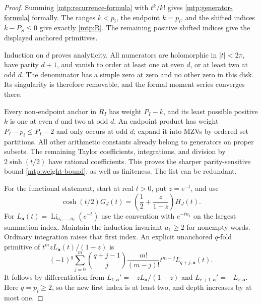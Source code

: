\documentclass[11pt,letterpaper]{article}
\numberwithin{equation}{section}
\theoremstyle{definition}
\theoremstyle{remark}
\begin{document}
\begin{proof}
Summing \eqref{mtp:recurrence-formula} with $t^k/k!$ gives
\eqref{mtp:generator-formula} formally. The ranges $k<p_i$, the
endpoint $k=p_i$, and the shifted indices $k-P_S\le0$ give exactly
\eqref{mtp:R}. The remaining positive shifted indices give the displayed
anchored primitives.

Induction on $d$ proves analyticity. All numerators are holomorphic in
$|t|<2\pi$, have parity $d+1$, and vanish to order at least one at
even $d$, or at least two at odd $d$. The denominator has a simple
zero at zero and no other zero in this disk. Its singularity is
therefore removable, and the formal moment series converges there.

Every non-endpoint anchor in $R_I$ has weight $P_I-k$, and its least
possible positive $k$ is one at even $d$ and two at odd $d$. An
endpoint product has weight $P_I-p_i\le P_I-2$ and only occurs at
odd $d$; expand it into MZVs by ordered set partitions. All other
arithmetic constants already belong to generators on proper subsets.
The remaining Taylor coefficients, integrations, and division by
$2\sinh(t/2)$ have rational coefficients. This proves the sharper
parity-sensitive bound \eqref{mtp:weight-bound}, as well as finiteness.
The list can be redundant.

For the functional statement, start at real $t>0$, put $z=e^{-t}$,
and use
\[
 \cosh(t/2)G_J(t)=\left(\frac12+\frac z{1-z}\right)H_J(t).
\]
For $L_{\boldsymbol a}(t)=\operatorname{Li}_{a_1,\ldots,a_\ell}(e^{-t})$
use the convention with $e^{-tn_1}$ on the largest summation index.
Maintain the induction invariant $a_1\ge2$ for nonempty words.
Ordinary integration raises that first index. An explicit unanchored
$q$-fold primitive of $t^m zL_{\boldsymbol a}(t)/(1-z)$ is
\begin{equation}\label{mtp:polylog-primitive}
 (-1)^q\sum_{j=0}^m\binom{q+j-1}{j}\frac{m!}{(m-j)!}
                         t^{m-j}L_{q+j,\boldsymbol a}(t).
\end{equation}
It follows by differentiation from
$L_{1,\boldsymbol a}'=-zL_{\boldsymbol a}/(1-z)$ and
$L_{r+1,\boldsymbol a}'=-L_{r,\boldsymbol a}$. Here $q=p_i\ge2$,
so the new first index is at least two, and depth increases by at
most one.


\end{proof}
\end{document}
